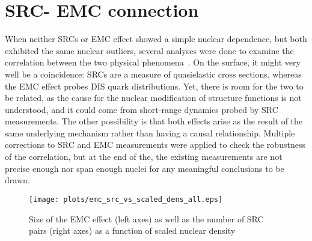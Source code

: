 \section{\label{sec:SRC_EMC}SRC- EMC connection}
When neither SRCs or EMC effect showed a simple nuclear dependence, but both exhibited the same nuclear outliers, several analyses were done to examine the correlation between the two physical phenomena~\cite{PhysRevC.86.065204, Hen:2012fm, Weinstein:2010rt}.  On the surface, it might very well be a coincidence: SRCs are a measure of quasielastic cross sections, whereas the EMC effect probes DIS quark distributions.  Yet, there is room for the two to be related, as the cause for the nuclear modification of structure functions is not understood, and it could come from short-range dynamics probed by SRC measurements.   The other possibility is that both effects arise as the result of the same underlying mechanism rather than having a causal relationship.  Multiple corrections to SRC and EMC measurements were applied to check the robustness of the correlation, but at the end of the, the existing measurements are not precise enough nor span enough nuclei for any meaningful conclusions to be drawn.
%
\begin{figure}[htb]
  \texttt{[image: plots/emc\_src\_vs\_scaled\_dens\_all.eps]}
  \caption{Size of the EMC effect (left axes) as well as the number of SRC pairs (right axes) as a function of scaled nuclear density}
  \label{fig:src_emc}
\end{figure}
